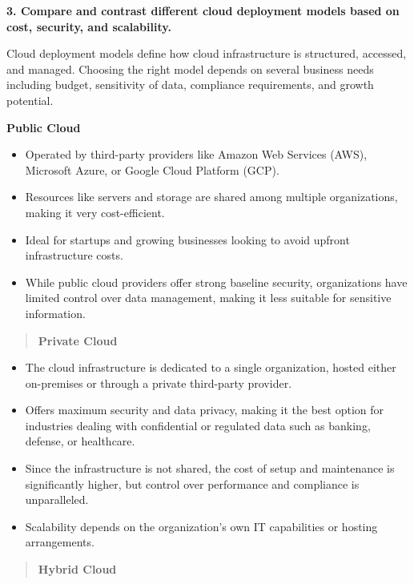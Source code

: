\documentclass[12pt]{article}
\begin{document}

\textbf{3. Compare and contrast different cloud deployment models based
on cost, security, and scalability.}

Cloud deployment models define how cloud infrastructure is structured,
accessed, and managed. Choosing the right model depends on several
business needs including budget, sensitivity of data, compliance
requirements, and growth potential.

\textbf{Public Cloud}

\begin{itemize}
\item
  Operated by third-party providers like Amazon Web Services (AWS),
  Microsoft Azure, or Google Cloud Platform (GCP).
\item
  Resources like servers and storage are shared among multiple
  organizations, making it very cost-efficient.
\item
  Ideal for startups and growing businesses looking to avoid upfront
  infrastructure costs.
\item
  While public cloud providers offer strong baseline security,
  organizations have limited control over data management, making it
  less suitable for sensitive information.
\end{itemize}

\begin{quote}
\textbf{Private Cloud}
\end{quote}

\begin{itemize}
\item
  The cloud infrastructure is dedicated to a single organization, hosted
  either on-premises or through a private third-party provider.
\item
  Offers maximum security and data privacy, making it the best option
  for industries dealing with confidential or regulated data such as
  banking, defense, or healthcare.
\item
  Since the infrastructure is not shared, the cost of setup and
  maintenance is significantly higher, but control over performance and
  compliance is unparalleled.
\item
  Scalability depends on the organization's own IT capabilities or
  hosting arrangements.
\end{itemize}

\begin{quote}
\textbf{Hybrid Cloud}
\end{quote}
\end{document}
